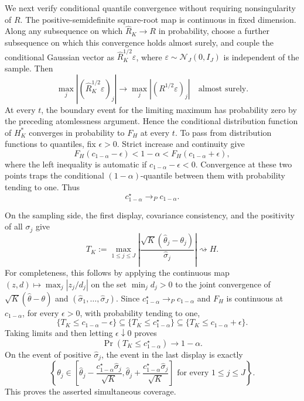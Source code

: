 We next verify conditional quantile convergence without requiring nonsingularity of \(R\).  The positive-semidefinite square-root map is continuous in fixed dimension.  Along any subsequence on which \(\widehat R_K\to R\) in probability, choose a further subsequence on which this convergence holds almost surely, and couple the conditional Gaussian vector as \(\widehat R_K^{1/2}\varepsilon\), where \(\varepsilon\sim\mathcal N_J(0,I_J)\) is independent of the sample.  Then
\[
 \max_j| (\widehat R_K^{1/2}\varepsilon)_j|
 \longrightarrow
 \max_j|(R^{1/2}\varepsilon)_j|
 \quad\text{almost surely}.
\]
At every \(t\), the boundary event for the limiting maximum has probability zero by the preceding atomlessness argument.  Hence the conditional distribution function of \(H_K^*\) converges in probability to \(F_H\) at every \(t\).  To pass from distribution functions to quantiles, fix \(\epsilon>0\).  Strict increase and continuity give
\[
 F_H(c_{1-\alpha}-\epsilon)<1-\alpha
 <F_H(c_{1-\alpha}+\epsilon),
\]
where the left inequality is automatic if \(c_{1-\alpha}-\epsilon<0\).  Convergence at these two points traps the conditional \((1-\alpha)\)-quantile between them with probability tending to one.  Thus
\[
 c_{1-\alpha}^\star\longrightarrow_Pc_{1-\alpha}.
\]

On the sampling side, the first display, covariance consistency, and the positivity of all \(\sigma_j\) give
\[
 T_K:=\max_{1\le j\le J}
 \left|\frac{\sqrt K(\widehat\theta_j-\theta_j)}{\widehat\sigma_j}\right|
 \rightsquigarrow H.
\]
For completeness, this follows by applying the continuous map
\((z,d)\mapsto\max_j|z_j/d_j|\) on the set \(\min_jd_j>0\) to the joint convergence of \(\sqrt K(\widehat\theta-\theta)\) and \((\widehat\sigma_1,\ldots,\widehat\sigma_J)\).  Since \(c_{1-\alpha}^\star\to_Pc_{1-\alpha}\) and \(F_H\) is continuous at \(c_{1-\alpha}\), for every \(\epsilon>0\), with probability tending to one,
\[
 \{T_K\le c_{1-\alpha}-\epsilon\}
 \subseteq\{T_K\le c_{1-\alpha}^\star\}
 \subseteq\{T_K\le c_{1-\alpha}+\epsilon\}.
\]
Taking limits and then letting \(\epsilon\downarrow0\) proves
\[
 \Pr(T_K\le c_{1-\alpha}^\star)\longrightarrow1-\alpha.
\]
On the event of positive \(\widehat\sigma_j\), the event in the last display is exactly
\[
 \left\{\theta_j\in
 \left[\widehat\theta_j-\frac{c_{1-\alpha}^\star\widehat\sigma_j}{\sqrt K},
       \widehat\theta_j+\frac{c_{1-\alpha}^\star\widehat\sigma_j}{\sqrt K}\right]
 \text{ for every }1\le j\le J\right\}.
\]
This proves the asserted simultaneous coverage.

